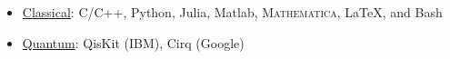 \renewcommand{\arraystretch}{1.1}	
	\begin{itemize}
	\vspace{1mm} 
	\item \underline{Classical}: C/C++, Python, Julia, Matlab, \textsc{Mathematica}, \LaTeX, and Bash
	\item \underline{Quantum}: QisKit (IBM), Cirq (Google)
	\end{itemize}
	
